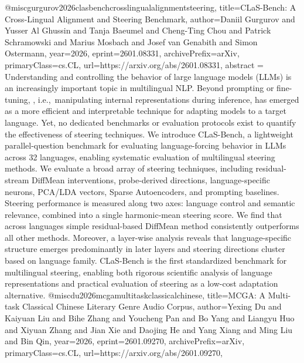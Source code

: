 {}@misc{gurgurov2026clasbenchcrosslingualalignmentsteering,
      title={CLaS-Bench: A Cross-Lingual Alignment and Steering Benchmark}, 
      author={Daniil Gurgurov and Yusser Al Ghussin and Tanja Baeumel and Cheng-Ting Chou and Patrick Schramowski and Marius Mosbach and Josef van Genabith and Simon Ostermann},
      year={2026},
      eprint={2601.08331},
      archivePrefix={arXiv},
      primaryClass={cs.CL},
      url={https://arxiv.org/abs/2601.08331},
      abstract = {Understanding and controlling the behavior of large language models (LLMs) is an increasingly important topic in multilingual NLP. Beyond prompting or fine-tuning, , i.e.,~manipulating internal representations during inference, has emerged as a more efficient and interpretable technique for adapting models to a target language. Yet, no dedicated benchmarks or evaluation protocols exist to quantify the effectiveness of steering techniques. We introduce CLaS-Bench, a lightweight parallel-question benchmark for evaluating language-forcing behavior in LLMs across 32 languages, enabling systematic evaluation of multilingual steering methods. We evaluate a broad array of steering techniques, including residual-stream DiffMean interventions, probe-derived directions, language-specific neurons, PCA/LDA vectors, Sparse Autoencoders, and prompting baselines. Steering performance is measured along two axes: language control and semantic relevance, combined into a single harmonic-mean steering score. We find that across languages simple residual-based DiffMean method consistently outperforms all other methods. Moreover, a layer-wise analysis reveals that language-specific structure emerges predominantly in later layers and steering directions cluster based on language family. CLaS-Bench is the first standardized benchmark for multilingual steering, enabling both rigorous scientific analysis of language representations and practical evaluation of steering as a low-cost adaptation alternative.}
}@misc{du2026mcgamultitaskclassicalchinese,
      title={MCGA: A Multi-task Classical Chinese Literary Genre Audio Corpus}, 
      author={Yexing Du and Kaiyuan Liu and Bihe Zhang and Youcheng Pan and Bo Yang and Liangyu Huo and Xiyuan Zhang and Jian Xie and Daojing He and Yang Xiang and Ming Liu and Bin Qin},
      year={2026},
      eprint={2601.09270},
      archivePrefix={arXiv},
      primaryClass={cs.CL},
      url={https://arxiv.org/abs/2601.09270},
}
